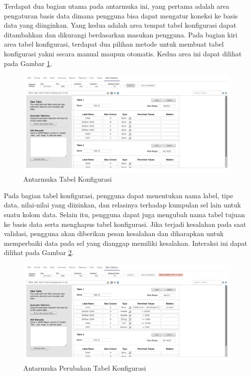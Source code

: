 	Terdapat dua bagian utama pada antarmuka ini, yang pertama adalah area pengaturan basis data dimana pengguna bisa dapat mengatur koneksi ke basis data yang diinginkan. Yang kedua adalah area tempat tabel konfigurasi dapat ditambahkan dan dikurangi berdasarkan masukan pengguna. Pada bagian kiri area tabel konfigurasi, terdapat dua pilihan metode untuk membuat tabel konfigurasi yakni secara manual maupun otomatis. Kedua area ini dapat dilihat pada Gambar \ref{Antarmuka2}.

	\begin{figure}[htbp]
	    \centering
	    \includegraphics[width=1.0\textwidth]{resources/chapter-4-interface-2.png}
	    \caption{Antarmuka Tabel Konfigurasi}
		\label{Antarmuka2}
	\end{figure}

	Pada bagian tabel konfigurasi, pengguna dapat menentukan nama label, tipe data, nilai-nilai yang diizinkan, dan relasinya terhadap kumpulan sel lain untuk suatu kolom data. Selain itu, pengguna dapat juga mengubah nama tabel tujuan ke basis data serta menghapus tabel konfigurasi. Jika terjadi kesalahan pada saat validasi, pengguna akan diberikan pesan kesalahan dan diharapkan untuk memperbaiki data pada sel yang dianggap memiliki kesalahan. Interaksi ini dapat dilihat pada Gambar \ref{Antarmuka3}.

	\begin{figure}[htbp]
	    \centering
	    \includegraphics[width=1.0\textwidth]{resources/chapter-4-interface-3a.png}
	    \caption{Antarmuka Perubahan Tabel Konfigurasi}
		\label{Antarmuka3}
	\end{figure}
	
